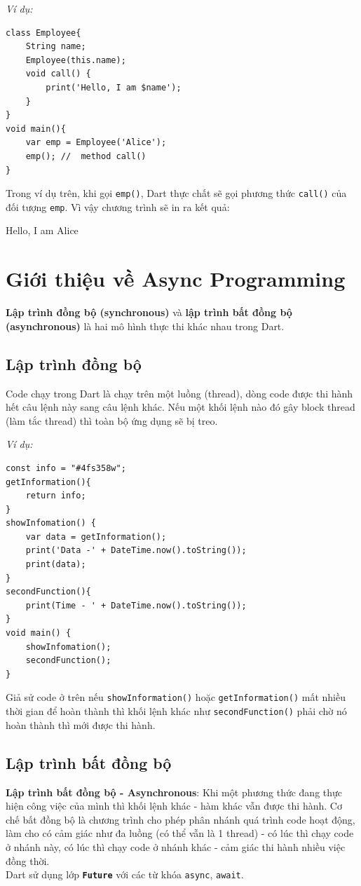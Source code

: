 \documentclass[../DoAn.tex]{subfiles}
\numberwithin{figure}{chapter}
\begin{document}
\textit{Ví dụ:}
\begin{lstlisting}
class Employee{
    String name;
    Employee(this.name);
    void call() { 
        print('Hello, I am $name'); 
    }
}
void main(){
    var emp = Employee('Alice');
    emp(); //  method call() 
}
\end{lstlisting}

Trong ví dụ trên, khi gọi \verb|emp()|, Dart thực chất sẽ gọi phương thức \verb|call()| của đối tượng \verb|emp|. Vì vậy chương trình sẽ in ra kết quả:
\begin{myverbatim}
    Hello, I am Alice
\end{myverbatim}

\section{Giới thiệu về Async Programming}
\textbf{Lập trình đồng bộ (synchronous)} và \textbf{lập trình bất đồng bộ (asynchronous)} là hai mô hình thực thi khác nhau trong Dart.
\subsection{Lập trình đồng bộ}
Code chạy trong Dart là chạy trên một luồng (thread), dòng code được thi hành hết câu lệnh này sang câu lệnh khác. Nếu một khối lệnh nào đó gây block thread (làm tắc thread) thì toàn bộ ứng dụng sẽ bị treo. 

\textit{Ví dụ:}

\begin{lstlisting} 
const info = "#4fs358w";
getInformation(){
    return info;
}
showInfomation() { 
    var data = getInformation();
    print('Data -' + DateTime.now().toString());
    print(data);
} 
secondFunction(){
    print(Time - ' + DateTime.now().toString());
}
void main() { 
    showInfomation(); 
    secondFunction();
} 
\end{lstlisting}

Giả sử code ở trên nếu \verb|showInformation()| hoặc \verb|getInformation()| mất nhiều thời gian để hoàn thành thì khối lệnh khác như \verb|secondFunction()| phải chờ nó hoàn thành thì mới được thi hành.
\subsection{Lập trình bất đồng bộ}
\textbf{Lập trình bất đồng bộ - Asynchronous}: Khi một phương thức đang thực hiện công việc của mình thì khối lệnh khác - hàm khác vẫn được thi hành. Cơ chế bất đồng bộ là chương trình cho phép phân nhánh quá
trình code hoạt động, làm cho có cảm giác như đa luồng (có thể
vẫn là 1 thread) - có lúc thì chạy code ở nhánh này, có lúc thì
chạy code ở nhánh khác - cảm giác thi hành nhiều việc đồng thời. \\
Dart sử dụng lớp \textbf{\texttt{Future}} với các từ khóa \texttt{async}, \texttt{await}.  
\end{document}
